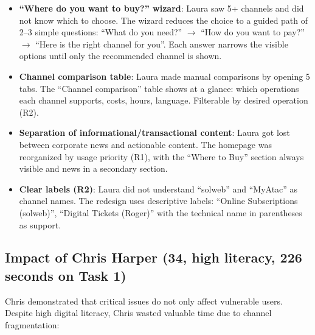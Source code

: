 \begin{itemize}
    \item \textbf{``Where do you want to buy?'' wizard}: Laura saw 5+ channels and did not know which to choose. The wizard reduces the choice to a guided path of 2--3 simple questions: ``What do you need?'' $\rightarrow$ ``How do you want to pay?'' $\rightarrow$ ``Here is the right channel for you''. Each answer narrows the visible options until only the recommended channel is shown.
    \item \textbf{Channel comparison table}: Laura made manual comparisons by opening 5 tabs. The ``Channel comparison'' table shows at a glance: which operations each channel supports, costs, hours, language. Filterable by desired operation (R2).
    \item \textbf{Separation of informational/transactional content}: Laura got lost between corporate news and actionable content. The homepage was reorganized by usage priority (R1), with the ``Where to Buy'' section always visible and news in a secondary section.
    \item \textbf{Clear labels (R2)}: Laura did not understand ``solweb'' and ``MyAtac'' as channel names. The redesign uses descriptive labels: ``Online Subscriptions (solweb)'', ``Digital Tickets (Roger)'' with the technical name in parentheses as support.
\end{itemize}

\subsection{Impact of Chris Harper (34, high literacy, 226 seconds on Task 1)}

Chris demonstrated that critical issues do not only affect vulnerable users. Despite high digital literacy, Chris wasted valuable time due to channel fragmentation:

